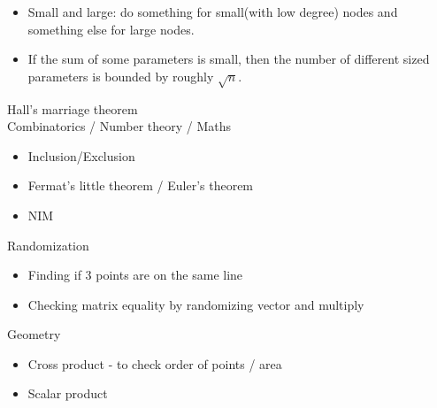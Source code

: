 \documentclass[8pt,a4paper,landscape,oneside]{amsart}
\begin{document}
\begin{multicols*}{2}
\begin{large}
\begin{itemize}
  \item Small and large: do something for small(with low degree) nodes and something else for large nodes.
  \item If the sum of some parameters is small, then the number of different sized parameters is bounded by roughly $\sqrt{n}$.
\end{itemize}
Hall's marriage theorem\\
Combinatorics / Number theory / Maths
\begin{itemize}
  \item Inclusion/Exclusion
  \item Fermat's little theorem / Euler's theorem
  \item NIM
\end{itemize}
Randomization
\begin{itemize}
  \item Finding if 3 points are on the same line
  \item Checking matrix equality by randomizing vector and multiply
\end{itemize}
Geometry
\begin{itemize}
  \item Cross product - to check order of points / area
  \item Scalar product
\end{itemize}

\end{large}
\end{multicols*}
\end{document}
